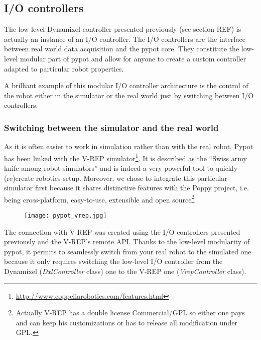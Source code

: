 \subsection{I/O controllers} %

The low-level Dynamixel controller presented previously (see section REF) is actually an instance of an I/O controller. The I/O controllers are the interface between real world data acquisition and the pypot core. They constitute the low-level modular part of pypot and allow for anyone to create a custom controller adapted to particular robot properties.

A brilliant example of this modular I/O controller architecture is the control of the robot either in the simulator or the real world just by switching between I/O controllers:

\subsubsection{Switching between the simulator and the real world} %

As it is often easier to work in simulation rather than with the real robot, Pypot has been linked with the V-REP simulator\footnote{\url{http://www.coppeliarobotics.com/features.html}}. It is described as the “Swiss army knife among robot simulators” and is indeed a very powerful tool to quickly (re)create robotics setup. Moreover, we chose to integrate this particular simulator first because it shares distinctive features with the Poppy project, i.e. being cross-platform, easy-to-use, extensible and open source\footnote{Actually V-REP has a double license Commercial/GPL so either one pays and can keep his customizations or has to release all modification under GPL.}

\begin{figure}[tb]
    \begin{center}
        \texttt{[image: pypot\_vrep.jpg]}
    \end{center}
    \caption{}
    \label{fig:pypot-vrep}
\end{figure}


The connection with V-REP was created using the I/O controllers presented previously and the V-REP’s remote API.
Thanks to the low-level modularity of pypot, it permits to seamlessly switch from your real robot to the simulated one because it only requires switching the low-level I/O controller from the Dynamixel (\emph{DxlController} class) one to the V-REP one (\emph{VrepController} class).

